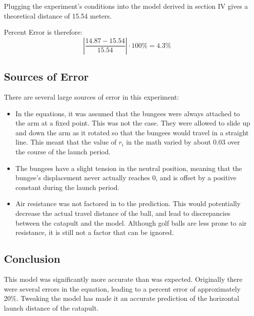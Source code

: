 \documentclass[10pt]{article}
\begin{document}
\begin{flushleft}
      Plugging the experiment's conditions into the model derived in section IV gives a theoretical distance of 15.54 meters.

      \par 
      Percent Error is therefore:
      $$ \left| \frac{14.87 - 15.54}{15.54} \right| \cdot 100\% = 4.3\% $$

    \subsection{Sources of Error}
      There are several large sources of error in this experiment:
      \begin{itemize}
        \item In the equations, it was assumed that the bungees were always attached to the arm at a fixed point. 
          This was not the case. 
          They were allowed to slide up and down the arm as it rotated so that the bungees would travel in a straight line.
          This meant that the value of $r_i$ in the math varied by about 0.03 over the course of the launch period.
        \item The bungees have a slight tension in the neutral position, meaning that the bungee's displacement never actually reaches 0, and is offset by a positive constant during the launch period.
        \item Air resistance was not factored in to the prediction. 
          This would potentially decrease the actual travel distance of the ball, and lead to discrepancies between the catapult and the model.
          Although golf balls are less prone to air resistance, it is still not a factor that can be ignored.
      \end{itemize}

    \subsection{Conclusion}
      This model was significantly more accurate than was expected. Originally there were several errors in the equation, leading to a percent error of approximately 20\%. Tweaking the model has made it an accurate prediction of the horizontal launch distance of the catapult.

\end{flushleft}
\end{document}
